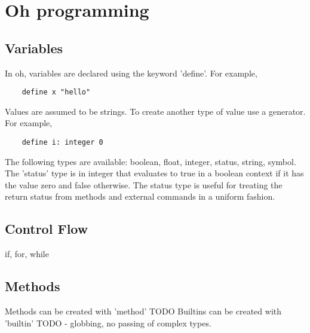 \documentclass[12pt]{book}
\begin{document}
\chapter{Oh programming}


\section{Variables}

In oh, variables are declared using the keyword 'define'. For example,

\begin{lstlisting}
	define x "hello"
\end{lstlisting}

Values are assumed to be strings. To create another type of value
use a generator. For example,

\begin{lstlisting}
	define i: integer 0
\end{lstlisting}

The following types are available: boolean, float, integer, status,
string, symbol. The 'status' type is in integer that evaluates to
true in a boolean context if it has the value zero and false
otherwise. The status type is useful for treating the return status
from methods and external commands in a uniform fashion.


\section{Control Flow}

if, for, while


\section{Methods}

Methods can be created with 'method' TODO
Builtins can be created with 'builtin' TODO - globbing, no passing
of complex types.



\end{document}
